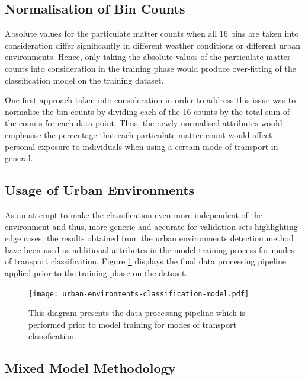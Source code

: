 \documentclass[bsc,frontabs,twoside,singlespacing,parskip,deptreport]{infthesis}     %
\begin{document}
\subsection{Normalisation of Bin Counts}
\label{subsec:bin-count-normalisation}

Absolute values for the particulate matter counts when all 16 bins are taken into consideration differ significantly in different weather conditions or different urban environments. Hence, only taking the absolute values of the particulate matter counts into consideration in the training phase would produce over-fitting of the classification model on the training dataset.

One first approach taken into consideration in order to address this issue was to normalise the bin counts by dividing each of the 16 counts by the total sum of the counts for each data point. Thus, the newly normalised attributes would emphasise the percentage that each particulate matter count would affect personal exposure to individuals when using a certain mode of transport in general.

\subsection{Usage of Urban Environments}

As an attempt to make the classification even more independent of the environment and thus, more generic and accurate for validation sets highlighting edge cases, the results obtained from the urban environments detection method have been used as additional attributes in the model training process for modes of transport classification. Figure \ref{fig:urban-environments-classification-model} displays the final data processing pipeline applied prior to the training phase on the dataset.

\begin{figure}[h!]
  \center
  \texttt{[image: urban-environments-classification-model.pdf]}
  \caption{This diagram presents the data processing pipeline which is performed prior to model training for modes of transport classification.}
  \label{fig:urban-environments-classification-model}
\end{figure}

\subsection{Mixed Model Methodology}
\label{subsec:mixed-model-methodology}
\end{document}
